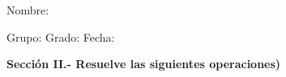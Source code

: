 \documentclass[12pt,addpoints]{exam}
\begin{document}
%

Nombre:\enspace\hrulefill

\vspace{5mm}

Grupo:\enspace\hrulefill
\enspace{}Grado:\enspace\hrulefill
\enspace{}Fecha:\enspace\hrulefill

\begin{questions}









\end{questions}

\newpage

\begin{questions}
\begin{EnvFullwidth}
  \sffamily\textbf{Sección II.- Resuelve las siguientes operaciones)}
\end{EnvFullwidth}



\end{questions}
\end{document}
